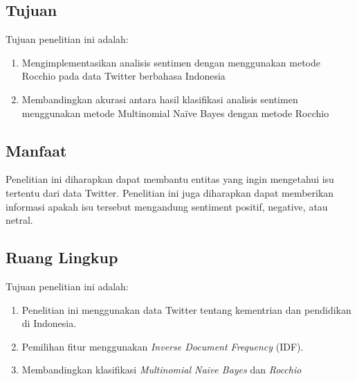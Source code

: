 \subsection*{Tujuan}
Tujuan penelitian ini adalah: 
\begin{enumerate}[noitemsep] 
	\item Mengimplementasikan analisis sentimen dengan menggunakan metode Rocchio pada data Twitter berbahasa Indonesia
	\item Membandingkan akurasi antara hasil klasifikasi analisis sentimen menggunakan metode Multinomial Naïve Bayes dengan metode Rocchio
	
\end{enumerate}

\subsection*{Manfaat}
Penelitian ini diharapkan dapat membantu entitas yang ingin mengetahui isu tertentu dari data Twitter. Penelitian ini juga diharapkan dapat memberikan informasi apakah isu tersebut mengandung sentiment positif, negative, atau netral.

\subsection*{Ruang Lingkup}
Tujuan penelitian ini adalah: 
\begin{enumerate}[noitemsep] 
	\item Penelitian ini menggunakan data Twitter tentang kementrian dan pendidikan di Indonesia.
	\item Pemilihan fitur menggunakan \textit{Inverse Document Frequency} (IDF).
	\item Membandingkan klasifikasi \textit{Multinomial Naive Bayes} dan \textit{Rocchio}
\end{enumerate}